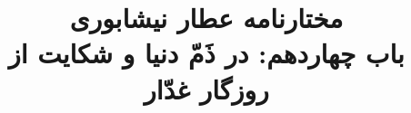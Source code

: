 \documentclass[14pt,b5paper]{article}
\begin{document}
\title{\Huge مختارنامه عطار نیشابوری \\
باب چهاردهم: در ذَمّ دنیا و شکایت از روزگار غدّار}
\author{ }
\date{ }
\maketitle
\newpage
\tableofcontents
\newpage

\newpage

\newpage

\newpage

\newpage

\newpage

\newpage

\newpage

\newpage

\newpage

\newpage

\newpage

\newpage

\newpage

\newpage

\newpage

\newpage

\newpage

\newpage

\newpage

\newpage

\newpage

\newpage

\newpage

\newpage

\newpage

\newpage

\newpage

\newpage

\newpage

\newpage
\end{document}
